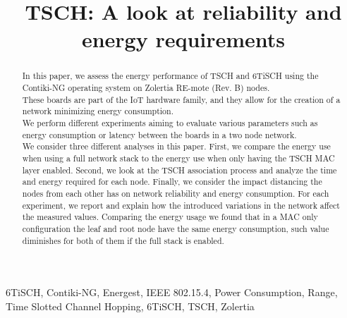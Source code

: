 \documentclass[conference]{IEEEtran}
\renewcommand\_{\textunderscore\allowbreak}
\begin{document}
\title{TSCH: A look at reliability and energy requirements}

\author{
\and
{}
}

\maketitle

\begin{abstract}
In this paper, we assess the energy performance of TSCH and 6TiSCH using the Contiki-NG operating system on Zolertia RE-mote (Rev. B) nodes.\\
These boards are part of the IoT hardware family, and they allow for the creation of a network minimizing energy consumption.\\
We perform different experiments aiming to evaluate various parameters such as energy consumption or latency between the boards in a two node network.\\
We consider three different analyses in this paper. First, we compare the energy use when using a full network stack to the energy use when only having the TSCH MAC layer enabled. Second, we look at the TSCH association process and analyze the time and energy required for each node. Finally, we consider the impact distancing the nodes from each other has on network reliability and energy consumption. 
\cite{TODO: FIX ABSTRACT}
For each experiment, we report and explain how the introduced variations in the network affect the measured values.
Comparing the energy usage we found that in a MAC only configuration the leaf and root node have the same energy consumption, such value diminishes for both of them if the full stack is enabled.
\end{abstract}

\begin{IEEEkeywords}
6TiSCH, Contiki-NG, Energest, IEEE 802.15.4, Power Consumption, Range, Time Slotted Channel Hopping, 6TiSCH, TSCH, Zolertia
\end{IEEEkeywords}
\end{document}
